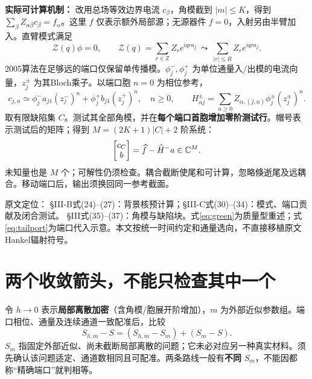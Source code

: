 \documentclass[UTF8,fontset=none,11pt,a4paper]{ctexart}
\newcommand{\source}[1]{{\small\raggedright\color{teal}原文定位：#1\par}}
\newcommand{\nextpage}{\clearpage}
\begin{document}
\textbf{实际可计算机制：} 改用总场等效边界电流 $c_\beta$，角模截到 $|m|\le K$，得到 $\sum_\beta Z_{\alpha\beta}c_\beta=f_\alpha$。这里 $f$ 仅表示额外局部源；无源器件 $f=0$，入射另由半臂加入。直臂模式满足
\begin{equation}\label{eq:blochz}
 \mathcal Z(q)\phi=0,\qquad
 \mathcal Z(q)=\sum_{r\in\mathbb Z}Z_re^{iqra_j}
 \ \leadsto\ \sum_{|r|\le R}Z_re^{iqra_j}.
\end{equation}
2005算法在足够远的端口仅保留单传播模。$\phi_j^-,\phi_j^+$ 为单位通量入/出模的电流向量，$z_j^\pm$ 为其Bloch乘子。以端口胞 $n=0$ 为相位参考，
\begin{equation}\label{eq:tailport}
 c_{j,n}\simeq \phi_j^- a_{j1}(z_j^-)^n+\phi_j^+ b_{j1}(z_j^+)^n,\quad n\ge0,
 \qquad H_{\alpha j}^{\pm}=\sum_{n\ge0}Z_{\alpha,(j,n)}\phi_j^\pm(z_j^\pm)^n .
\end{equation}
取有限缺陷集 $C$。测试其全部角模，并在\textbf{每个端口首胞增加零阶测试行}。帽号表示测试后的矩阵；得到 $M=(2K+1)|C|+2$ 阶系统：
\vspace{1mm}
\begin{equation}
 [\,\widehat Z_C\ \widehat H^+\,]
 \begin{bmatrix}c_C\\b\end{bmatrix}
 =\widehat f-\widehat H^-a\in\C^M .
\end{equation}
未知量也是 $M$ 个；可解性仍须检查。耦合截断使尾和可计算，忽略倏逝尾及远耦合。移动端口后，输出须换回同一参考截面。

\source{\cite{pissoort2005} §III-B式(24)--(27)：背景核预计算；§III-C式(30)--(34)：模式、端口贡献及闭合测试。\cite{pissoort2007} §III式(35)--(37)：角模与缺陷块。式\eqref{eq:green}为质量型重述；式\eqref{eq:tailport}为端口代入示意。本文按统一时间约定和通量选向，不直接移植原文Hankel辐射符号。}

\nextpage
\section{两个收敛箭头，不能只检查其中一个}
令 $h\to0$ 表示\textbf{局部离散加密}（含角模/胞展开阶增加），$m$ 为外部近似参数组。端口相位、通量及连续通道一致配准后，比较
\begin{equation}\label{eq:error}
 S_{h,m}-S=(S_{h,m}-S_m)+(S_m-S).
\end{equation}
$S_m$ 指固定外部近似、尚未截断局部离散的问题；它未必对应另一种真实材料。须先确认该问题适定、通道数相同且可配准。两条路线一般有\textbf{不同} $S_m$，不能因都称“精确端口”就判相等。
\end{document}

